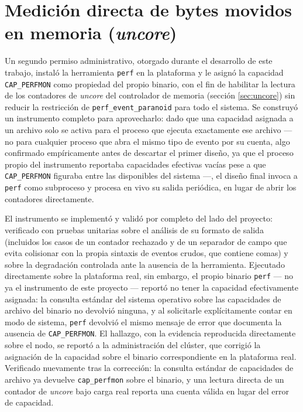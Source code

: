 \documentclass[12pt,oneside,spanish]{book}
\begin{document}
\section{Medición directa de bytes movidos en memoria (\textit{uncore})}
\label{sec:resultados-uncore}

Un segundo permiso administrativo, otorgado durante el desarrollo de este trabajo, instaló la herramienta \texttt{perf} en la plataforma y le asignó la capacidad \texttt{CAP\_PERFMON} como propiedad del propio binario, con el fin de habilitar la lectura de los contadores de \textit{uncore} del controlador de memoria (sección \ref{sec:uncore}) sin reducir la restricción de \texttt{perf\_event\_paranoid} para todo el sistema. Se construyó un instrumento completo para aprovecharlo: dado que una capacidad asignada a un archivo solo se activa para el proceso que ejecuta exactamente ese archivo --- no para cualquier proceso que abra el mismo tipo de evento por su cuenta, algo confirmado empíricamente antes de descartar el primer diseño, ya que el proceso propio del instrumento reportaba capacidades efectivas vacías pese a que \texttt{CAP\_PERFMON} figuraba entre las disponibles del sistema ---, el diseño final invoca a \texttt{perf} como subproceso y procesa en vivo su salida periódica, en lugar de abrir los contadores directamente.

El instrumento se implementó y validó por completo del lado del proyecto: verificado con pruebas unitarias sobre el análisis de su formato de salida (incluidos los casos de un contador rechazado y de un separador de campo que evita colisionar con la propia sintaxis de eventos crudos, que contiene comas) y sobre la degradación controlada ante la ausencia de la herramienta. Ejecutado directamente sobre la plataforma real, sin embargo, el propio binario \texttt{perf} --- no ya el instrumento de este proyecto --- reportó no tener la capacidad efectivamente asignada: la consulta estándar del sistema operativo sobre las capacidades de archivo del binario no devolvió ninguna, y al solicitarle explícitamente contar en modo de sistema, \texttt{perf} devolvió el mismo mensaje de error que documenta la ausencia de \texttt{CAP\_PERFMON}. El hallazgo, con la evidencia reproducida directamente sobre el nodo, se reportó a la administración del clúster, que corrigió la asignación de la capacidad sobre el binario correspondiente en la plataforma real. Verificado nuevamente tras la corrección: la consulta estándar de capacidades de archivo ya devuelve \texttt{cap\_perfmon} sobre el binario, y una lectura directa de un contador de \textit{uncore} bajo carga real reporta una cuenta válida en lugar del error de capacidad.
\end{document}
